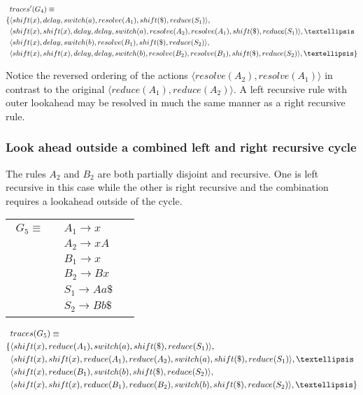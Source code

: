 \documentclass[a4paper,11pt]{article}
\begin{document}
{\small\parbox{.3\textwidth}{\begin{align*}
&traces^{\prime}(G_4) \equiv \\
\{ & \langle shift(x), delay, switch(a), resolve(A_1), shift(\$), reduce(S_1) \rangle,\\
   & \langle shift(x), shift(x), delay, delay, switch(a), resolve(A_2), resolve(A_1), shift(\$), reduce(S_1) \rangle, \textellipsis \\
   & \langle shift(x), delay, switch(b), resolve(B_1), shift(\$), reduce(S_2) \rangle,\\
   & \langle shift(x), shift(x), delay, delay, switch(b), resolve(B_2), resolve(B_1), shift(\$), reduce(S_2) \rangle, \textellipsis \}
\end{align*}}}

Notice the reversed ordering of the actions $\langle resolve(A_2), resolve(A_1) \rangle$ in contrast to the original $\langle reduce(A_1), reduce(A_2) \rangle$.
A left recursive rule with outer lookahead may be resolved in much the same manner as a right recursive rule.

\subsubsection{Look ahead outside a combined left and right recursive cycle}
The rules $A_2$ and $B_2$ are both partially disjoint and recursive. One is left recursive in this case while the other is right recursive and the combination
requires a lookahead outside of the cycle.

\begin{tabular}[t]{cl}
\parbox{.3\textwidth}{
\begin{align*}
G_5 \equiv \quad & A_1 \rightarrow x\\
                 & A_2 \rightarrow x A\\
                 & B_1 \rightarrow x\\
                 & B_2 \rightarrow B x\\
                 & S_1 \rightarrow A a \$\\
                 & S_2 \rightarrow B b \$
\end{align*}}
\parbox{.6\textwidth}{}
\end{tabular}

{\small\parbox{.3\textwidth}{\begin{align*}
&traces(G_5) \equiv \\
\{ & \langle shift(x), reduce(A_1), switch(a), shift(\$), reduce(S_1) \rangle,\\
   & \langle shift(x), shift(x), reduce(A_1), reduce(A_2), switch(a), shift(\$), reduce(S_1) \rangle, \textellipsis \\
   & \langle shift(x), reduce(B_1), switch(b), shift(\$), reduce(S_2) \rangle,\\
   & \langle shift(x), shift(x), reduce(B_1), reduce(B_2), switch(b), shift(\$), reduce(S_2) \rangle, \textellipsis \}
\end{align*}}}
\end{document}
